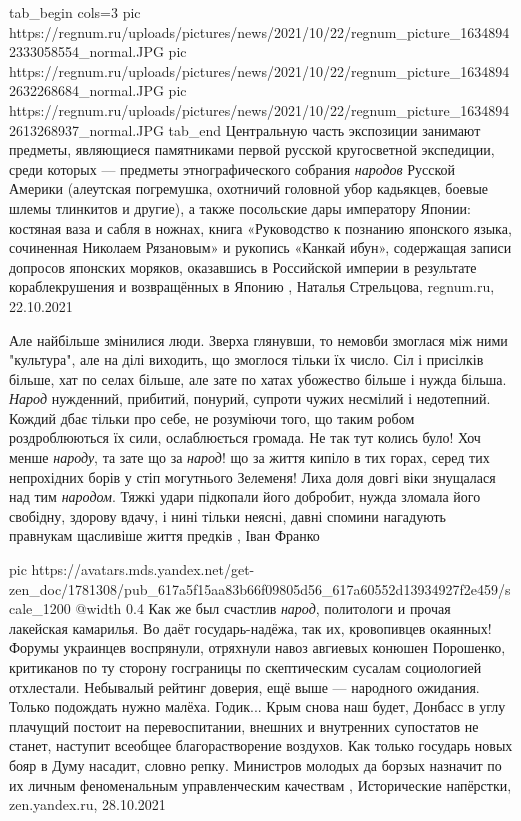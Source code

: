 \ifcmt
  tab_begin cols=3
     pic https://regnum.ru/uploads/pictures/news/2021/10/22/regnum_picture_16348942333058554_normal.JPG
     pic https://regnum.ru/uploads/pictures/news/2021/10/22/regnum_picture_16348942632268684_normal.JPG
		 pic https://regnum.ru/uploads/pictures/news/2021/10/22/regnum_picture_16348942613268937_normal.JPG
  tab_end
\fi
Центральную часть экспозиции занимают предметы, являющиеся памятниками первой
русской кругосветной экспедиции, среди которых — предметы этнографического
собрания \emph{народов} Русской Америки (алеутская погремушка, охотничий головной убор
кадьякцев, боевые шлемы тлинкитов и другие), а также посольские дары императору
Японии: костяная ваза и сабля в ножнах, книга «Руководство к познанию японского
языка, сочиненная Николаем Рязановым» и рукопись «Канкай ибун», содержащая
записи допросов японских моряков, оказавшись в Российской империи в результате
кораблекрушения и возвращённых в Японию
, 
Наталья Стрельцова, regnum.ru, 22.10.2021

Але найбільше змінилися люди. Зверха глянувши, то немовби змоглася між ними
"культура", але на ділі виходить, що змоглося тільки їх число. Сіл і присілків
більше, хат по селах більше, але зате по хатах убожество більше і нужда більша.
\emph{Народ} нужденний, прибитий, понурий, супроти чужих несмілий і недотепний. Кождий
дбає тільки про себе, не розуміючи того, що таким робом роздроблюються їх сили,
ослаблюється громада. Не так тут колись було! Хоч менше \emph{народу}, та зате що за
\emph{народ}! що за життя кипіло в тих горах, серед тих непрохідних борів у стіп
могутнього Зелеменя! Лиха доля довгі віки знущалася над тим \emph{народом}. Тяжкі
удари підкопали його добробит, нужда зломала його свобідну, здорову вдачу, і
нині тільки неясні, давні спомини нагадують правнукам щасливіше життя предків
, Іван Франко

\ifcmt
  pic https://avatars.mds.yandex.net/get-zen_doc/1781308/pub_617a5f15aa83b66f09805d56_617a60552d13934927f2e459/scale_1200
  @width 0.4
\fi
Как же был счастлив \emph{народ}, политологи и прочая лакейская камарилья. Во даёт
государь-надёжа, так их, кровопивцев окаянных! Форумы украинцев воспрянули,
отряхнули навоз авгиевых конюшен Порошенко, критиканов по ту сторону госграницы
по скептическим сусалам социологией отхлестали. Небывалый рейтинг доверия, ещё
выше — народного ожидания. Только подождать нужно малёха.
Годик... Крым снова наш будет, Донбасс в углу плачущий постоит на
перевоспитании, внешних и внутренних супостатов не станет, наступит всеобщее
благорастворение воздухов. Как только государь новых бояр в Думу насадит,
словно репку. Министров молодых да борзых назначит по их личным феноменальным
управленческим качествам
, 
Исторические напёрстки, zen.yandex.ru, 28.10.2021

